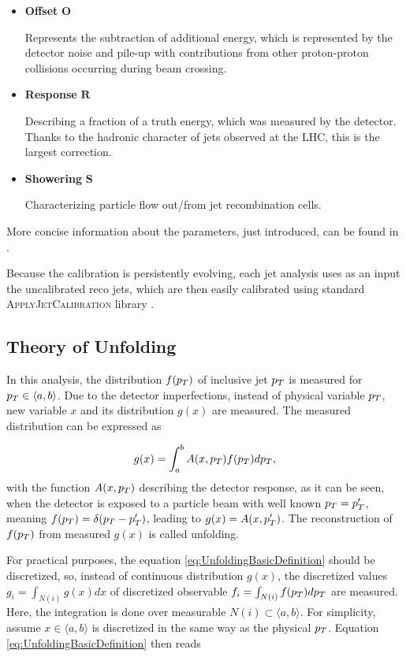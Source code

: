 \begin{itemize}
  \item \textbf{Offset} $\mathbf{O}$

    Represents the subtraction of additional energy, which is represented by the
    detector noise and pile-up with contributions from other proton-proton
    collisions occurring during beam crossing.

  \item \textbf{Response} $\mathbf{R}$

    Describing a fraction of a truth energy, which was measured by the
    detector. Thanks to the hadronic character of jets observed at the LHC, this
    is the largest correction.

  \item \textbf{Showering} $\mathbf{S}$

    Characterizing particle flow out/from jet recombination cells.

\end{itemize}

More concise information about the parameters, just introduced, can be found in
\cite{ZdenekThesis}.

Because the calibration is persistently evolving, each jet analysis uses as an
input the uncalibrated reco jets, which are then easily calibrated using
standard \textsc{ApplyJetCalibration} library \cite{ApplyJetCalibration}.

\subsection{Theory of Unfolding}

In this analysis, the distribution $f(p_{T})$ of inclusive jet $p_{T}$ is measured
for $p_{T} \in \langle a, b \rangle$. Due to the detector imperfections,
instead of physical variable $p_{T}$, new variable $x$ and its distribution
$g(x)$ are measured. The measured distribution can be expressed as

\begin{equation}
  g(x) = \int_a^b A(x, p_{T}) f(p_{T}) dp_{T},
  \label{eq:UnfoldingBasicDefinition}
\end{equation}
with the function $A(x, p_{T})$ describing the detector response, as it can be
seen, when the detector is exposed to a particle beam with well known $p_{T} =
p_{T}'$, meaning $f(p_{T}) = \delta(p_{T} - p_{T}')$, leading to $g(x) = A(x, p_{T}')$. The
reconstruction of $f(p_{T})$ from measured $g(x)$ is called unfolding.

For practical purposes, the equation \eqref{eq:UnfoldingBasicDefinition} should
be discretized, so, instead of continuous distribution $g(x)$, the discretized
values $g_i = \int_{N(i)} g(x)dx$ of discretized observable $f_i =
\int_{N(i)} f(p_{T})dp_{T}$ are measured. Here, the integration is done over
measurable $N(i) \subset \langle a, b \rangle$. For simplicity, assume $x \in
\langle a, b \rangle$ is discretized in the same way as the physical $p_{T}$.
Equation \eqref{eq:UnfoldingBasicDefinition} then reads

